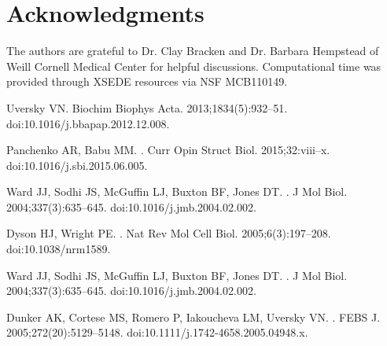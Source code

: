 \documentclass[10pt,letterpaper]{article}
\begin{document}
\section*{Acknowledgments}
The authors are grateful to Dr. Clay Bracken and Dr. Barbara Hempstead of Weill Cornell Medical Center for helpful discussions. Computational time was provided through XSEDE resources via NSF MCB110149. 




%
%
\begin{thebibliography}{10}

Uversky VN.
\newblock Biochim Biophys Acta. 2013;1834(5):932--51.
\newblock doi:{10.1016/j.bbapap.2012.12.008}.

Panchenko AR, Babu MM.
.
\newblock Curr Opin Struct Biol. 2015;32:viii--x.
\newblock doi:{10.1016/j.sbi.2015.06.005}.

Ward JJ, Sodhi JS, McGuffin LJ, Buxton BF, Jones DT.
.
\newblock J Mol Biol. 2004;337(3):635--645.
\newblock doi:{10.1016/j.jmb.2004.02.002}.

Dyson HJ, Wright PE.
.
\newblock Nat Rev Mol Cell Biol. 2005;6(3):197--208.
\newblock doi:{10.1038/nrm1589}.

Ward JJ, Sodhi JS, McGuffin LJ, Buxton BF, Jones DT.
.
\newblock J Mol Biol. 2004;337(3):635--645.
\newblock doi:{10.1016/j.jmb.2004.02.002}.

Dunker AK, Cortese MS, Romero P, Iakoucheva LM, Uversky VN.
.
\newblock FEBS J. 2005;272(20):5129--5148.
\newblock doi:{10.1111/j.1742-4658.2005.04948.x}.


\end{thebibliography}
\end{document}
